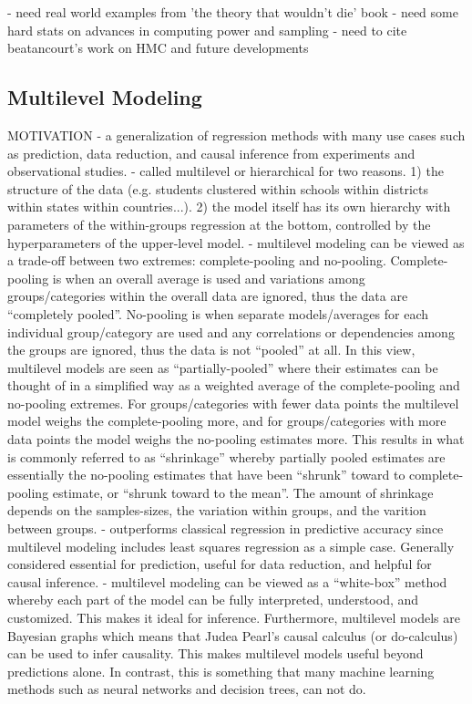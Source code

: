 - need real world examples from 'the theory that wouldn't die' book
- need some hard stats on advances in computing power and sampling
- need to cite beatancourt's work on HMC and future developments

\subsection{Multilevel Modeling}

MOTIVATION
- a generalization of regression methods with many use cases such as prediction, data reduction, and causal inference from experiments and observational studies.
- called multilevel or hierarchical for two reasons. 1) the structure of the data (e.g. students clustered within schools within districts within states within countries...). 2) the model itself has its own hierarchy with parameters of the within-groups regression at the bottom, controlled by the hyperparameters of the upper-level model.
- multilevel modeling can be viewed as a trade-off between two extremes: complete-pooling and no-pooling. Complete-pooling is when an overall average is used and variations among groups/categories within the overall data are ignored, thus the data are “completely pooled”. No-pooling is when separate models/averages for each individual group/category are used and any correlations or dependencies among the groups are ignored, thus the data is not “pooled” at all. In this view, multilevel models are seen as “partially-pooled” where their estimates can be thought of in a simplified way as a weighted average of the complete-pooling and no-pooling extremes. For groups/categories with fewer data points the multilevel model weighs the complete-pooling more, and for groups/categories with more data points the model weighs the no-pooling estimates more. This results in what is commonly referred to as “shrinkage” whereby partially pooled estimates are essentially the no-pooling estimates that have been “shrunk” toward to complete-pooling estimate, or “shrunk toward to the mean”. The amount of shrinkage depends on the samples-sizes, the variation within groups, and the varition between groups.
- outperforms classical regression in predictive accuracy since multilevel modeling includes least squares regression as a simple case. Generally considered essential for prediction, useful for data reduction, and helpful for causal inference.
- multilevel modeling can be viewed as a “white-box” method whereby each part of the model can be fully interpreted, understood, and customized. This makes it ideal for inference. Furthermore, multilevel models are Bayesian graphs which means that Judea Pearl’s causal calculus (or do-calculus) can be used to infer causality. This makes multilevel models useful beyond predictions alone. In contrast, this is something that many machine learning methods such as neural networks and decision trees, can not do.
